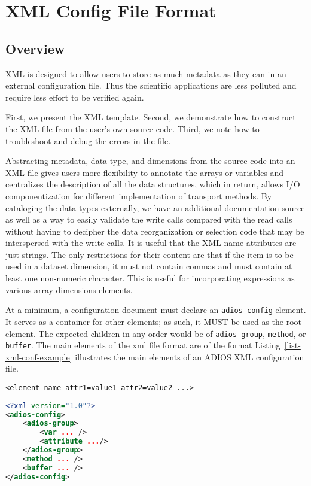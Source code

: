 \chapter{XML Config File Format}
\label{chapter-xml}

\section{Overview} 
XML is designed to allow users to store as much metadata as they can in an external 
configuration file. Thus the scientific applications are less polluted and require 
less effort to be verified again.

First, we present the XML template. Second, we demonstrate how to construct the 
XML file from the user's own source code. Third, we note how to troubleshoot and 
debug the errors in the file.  

Abstracting metadata, data type, and dimensions from the source code into an XML 
file gives users more flexibility to annotate the arrays or variables and centralizes 
the description of all the data structures, which in return, allows I/O componentization 
for different implementation of transport methods. By cataloging the data types 
externally, we have an additional documentation source as well as a way to easily 
validate the write calls compared with the read calls without having to decipher 
the data reorganization or selection code that may be interspersed with the write 
calls. It is useful that the XML name attributes are just strings. The only restrictions 
for their content are that if the item is to be used in a dataset dimension, it 
must not contain commas and must contain at least one non-numeric character. This 
is useful for incorporating expressions as various array dimensions elements. 

At a minimum, a configuration document must declare an \verb+adios-config+ element. It 
serves as a container for other elements; as such, it MUST be used as the root 
element. The expected children in any order would be of \verb+adios-group+, 
\verb+method+, or \verb+buffer+. The main elements of the xml file format are of the format 
Listing~\ref{list-xml-conf-example} illustrates the main elements of an ADIOS XML configuration file. 

\begin{lstlisting}
<element-name attr1=value1 attr2=value2 ...>
\end{lstlisting}

\begin{lstlisting}[language=XML, caption={Example XML configuration}, label=list-xml-conf-example]
<?xml version="1.0"?>
<adios-config> 
    <adios-group>
        <var ... />
        <attribute .../>
    </adios-group>
    <method ... />
    <buffer ... />
</adios-config>
\end{lstlisting}

